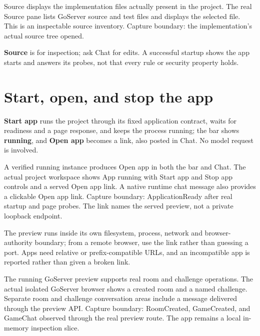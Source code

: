   {Source displays the implementation files actually present in the project.}
  {The real Source pane lists GoServer source and test files and displays the selected file. This is an inspectable source inventory.}
  {Capture boundary: the implementation's actual source tree opened.}

\textbf{Source} is for inspection; ask Chat for edits. A successful startup shows
the app starts and answers its probes, not that every rule or security property
holds.

\section{Start, open, and stop the app}

\textbf{Start app} runs the project through its fixed application contract, waits
for readiness and a page response, and keeps the process running; the bar shows
\textbf{running}, and \textbf{Open app} becomes a link, also posted in Chat. No
model request is involved.

  {A verified running instance produces Open app in both the bar and Chat.}
  {The actual project workspace shows App running with Start app and Stop app controls and a served Open app link. A native runtime chat message also provides a clickable Open app link.}
  {Capture boundary: ApplicationReady after real startup and page probes. The link names the served preview, not a private loopback endpoint.}

The preview runs inside its own filesystem, process, network and browser-authority
boundary; from a remote browser, use the link rather than guessing a port. Apps
need relative or prefix-compatible URLs, and an incompatible app is reported
rather than given a broken link.

  {The running GoServer preview supports real room and challenge operations.}
  {The actual isolated GoServer browser shows a created room and a named challenge. Separate room and challenge conversation areas include a message delivered through the preview API.}
  {Capture boundary: RoomCreated, GameCreated, and GameChat observed through the real preview route. The app remains a local in-memory inspection slice.}

